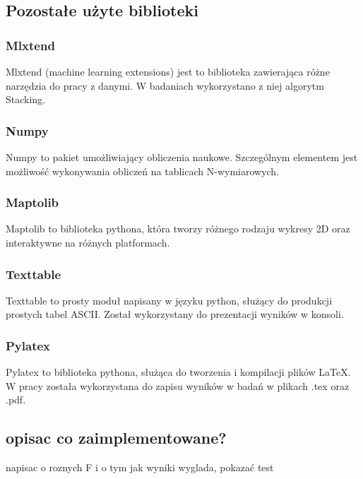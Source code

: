 \subsection{Pozostałe użyte biblioteki}
\subsubsection{Mlxtend}
Mlxtend (machine learning extensions)\cite{mlxtend} jest to biblioteka zawierająca różne narzędzia do pracy z danymi. W badaniach wykorzystano z niej algorytm Stacking.
\subsubsection{Numpy}
Numpy to pakiet umożliwiający obliczenia naukowe. Szczególnym elementem jest możliwość wykonywania obliczeń na tablicach N-wymiarowych. 
\subsubsection{Maptolib}
Maptolib to biblioteka pythona, która tworzy różnego rodzaju wykresy 2D oraz interaktywne na różnych platformach.
\subsubsection{Texttable}
Texttable to prosty moduł napisany w języku python, służący do produkcji prostych tabel ASCII. Został wykorzystany do prezentacji wyników w konsoli.
\subsubsection{Pylatex}
Pylatex to biblioteka pythona, służąca do tworzenia i kompilacji plików LaTeX. W pracy została wykorzystana do zapisu wyników w badań w plikach .tex oraz .pdf.
\subsection{opisac co zaimplementowane?}

 napisac o roznych F i o tym jak wyniki wyglada, pokazać test

